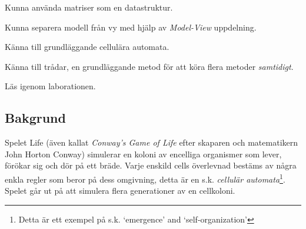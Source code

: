 


\Lab{\LabWeekTWELVE}

\begin{Goals}
    \item Kunna använda matriser som en datastruktur.
    \item Kunna separera modell från vy med hjälp av \emph{Model-View} uppdelning.
    \item Känna till grundläggande cellulära automata. %
    \item Känna till trådar, en grundläggande metod för att köra flera metoder \emph{samtidigt}.
\end{Goals}

\begin{Preparations}
    \item Läs igenom laborationen.
\end{Preparations}

\subsection{Bakgrund}

Spelet Life (även kallat \emph{Conway's Game of Life} efter skaparen och matematikern John Horton Conway) simulerar en koloni av encelliga organismer som lever, förökar sig och dör på ett bräde. Varje enskild cells överlevnad bestäms av några enkla regler som beror på dess omgivning, detta är en s.k. \emph{cellulär automata}\footnote{Detta är ett exempel på s.k. `emergence' and `self-organization'}.  Spelet går ut på att simulera flera generationer av en cellkoloni.


